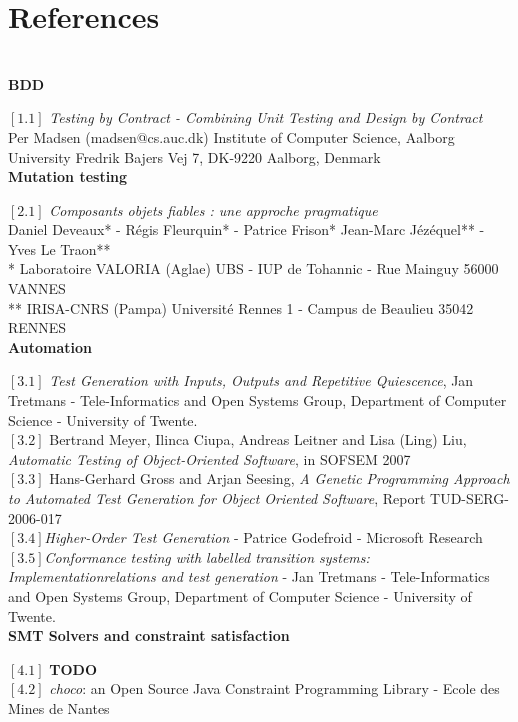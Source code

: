 \documentclass[a4paper]{report}
\begin{document}
\section*{References}
$ $\\
\newline
\textbf{BDD}\\
\newline
$[1.1]$ \textit{Testing by Contract
- Combining Unit Testing and Design by Contract}\\
Per Madsen (madsen@cs.auc.dk)
Institute of Computer Science, Aalborg University
Fredrik Bajers Vej 7, DK-9220 Aalborg, Denmark\\
\newline
\textbf{Mutation testing}\\
\newline
$[2.1]$ \textit{Composants objets fiables :
une approche pragmatique}\\
Daniel Deveaux* - Régis Fleurquin* - Patrice Frison*
Jean-Marc Jézéquel** - Yves Le Traon**\\
* Laboratoire VALORIA (Aglae)
UBS - IUP de Tohannic - Rue Mainguy
56000 VANNES\\
** IRISA-CNRS (Pampa)
Université Rennes 1 - Campus de Beaulieu
35042 RENNES\\
\newline
\textbf{Automation}\\
\newline
$[3.1]$ \textit{Test Generation with Inputs, Outputs and Repetitive Quiescence}, Jan Tretmans - Tele-Informatics and Open Systems Group, Department of Computer Science - University of Twente.\\
\newline
$[3.2]$ Bertrand Meyer, Ilinca Ciupa, Andreas Leitner and Lisa (Ling) Liu, \textit{Automatic Testing of Object-Oriented Software}, in SOFSEM 2007\\
\newline
$[3.3]$ Hans-Gerhard Gross and Arjan Seesing, 
\textit{A Genetic Programming Approach to Automated Test Generation for Object Oriented Software}, Report TUD-SERG-2006-017\\
\newline
$[3.4]$\textit{Higher-Order Test Generation} - 
Patrice Godefroid - 
Microsoft Research\\
\newline
$[3.5]$\textit{Conformance testing with labelled transition systems: Implementationrelations and test generation} - 
Jan Tretmans - 
Tele-Informatics and Open Systems Group, Department of Computer Science - University of Twente.\\
\newline
\textbf{SMT Solvers and constraint satisfaction}\\
\newline
$[4.1]$ {\color{red} \textbf{TODO}}\\
\newline
$[4.2]$ \textit{choco}: an Open Source Java Constraint Programming Library - Ecole des Mines de Nantes\\
\end{document}
